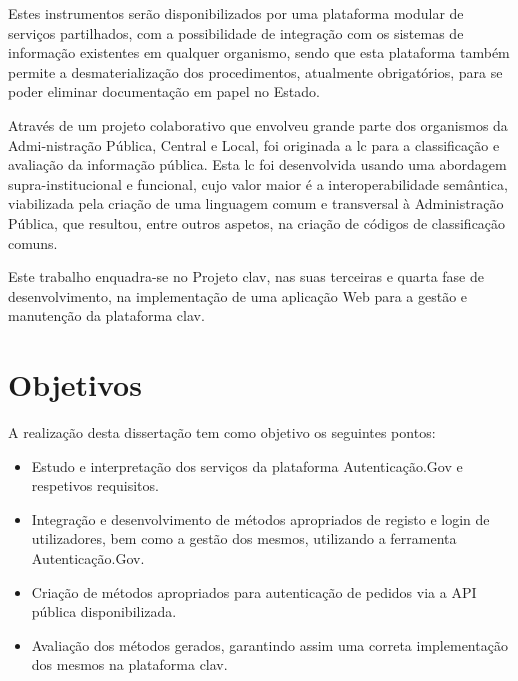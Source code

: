 Estes instrumentos serão disponibilizados por uma plataforma modular de serviços partilhados, com a possibilidade de integração com os sistemas de informação existentes em qualquer organismo, sendo que esta plataforma também permite a desmaterialização dos procedimentos, atualmente obrigatórios, para se poder eliminar documentação em papel no Estado.

Através de um projeto colaborativo que envolveu grande parte dos organismos da Admi-nistração Pública, Central e Local, foi originada a \gls{lc} para a classificação e avaliação da informação pública. Esta \gls{lc} foi desenvolvida usando uma abordagem supra-institucional e funcional, cujo valor maior é a interoperabilidade semântica, viabilizada pela criação de uma linguagem comum e transversal à Administração Pública, que resultou, entre outros aspetos, na criação de códigos de classificação comuns.

Este trabalho enquadra-se no Projeto \gls{clav}, nas suas terceiras e quarta fase de desenvolvimento, na implementação de uma aplicação Web para a gestão e manutenção da plataforma \gls{clav}. 


\section{Objetivos}

A realização desta dissertação tem como objetivo os seguintes pontos:

\begin{itemize}
    \item Estudo e interpretação dos serviços da plataforma Autenticação.Gov e respetivos requisitos.
    \item Integração e desenvolvimento de métodos apropriados de registo e login de utilizadores, bem como a gestão dos mesmos, utilizando a ferramenta Autenticação.Gov.
    \item Criação de métodos apropriados para autenticação de pedidos via a API pública disponibilizada.
    \item Avaliação dos métodos gerados, garantindo assim uma correta implementação dos mesmos na plataforma \gls{clav}.
\end{itemize}

